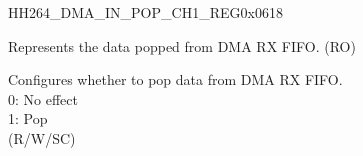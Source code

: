     
    \begin{register}{H}{H264\_DMA\_IN\_POP\_CH1\_REG}{0x0618}\label{regdesc:H264DMAINPOPCH1REG}
    \regnewline%
    \begin{regdesc}\begin{reglist}
    \label{fielddesc:H264DMAINFIFORDATACH1}\item [H264\_DMA\_INFIFO\_RDATA\_CH1] Represents the data popped from DMA RX FIFO. (RO)
    \label{fielddesc:H264DMAINFIFOPOPCH1}\item [H264\_DMA\_INFIFO\_POP\_CH1] Configures whether to pop data from DMA RX FIFO.\\
    0: No effect\\
    1: Pop\\ (R/W/SC)
    \end{reglist}\end{regdesc}
    \end{register}
    
